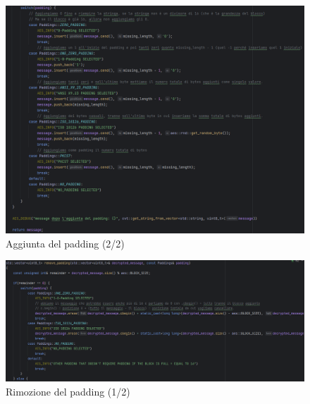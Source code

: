 \begin{figure}[H]
	\centering
	\includegraphics[width=1\textwidth, height=1\textheight, keepaspectratio]{./images/code/cpp/padding/add_padding1.PNG}
	\caption{Aggiunta del padding (2/2)}
	\label{fig:add_padding1}
\end{figure}

\textsf{\small }

\begin{figure}[H]
	\centering
	\includegraphics[width=1\textwidth, height=1\textheight, keepaspectratio]{./images/code/cpp/padding/remove_padding0.PNG}
	\caption{Rimozione del padding (1/2)}
	\label{fig:remove_padding0}
\end{figure}


